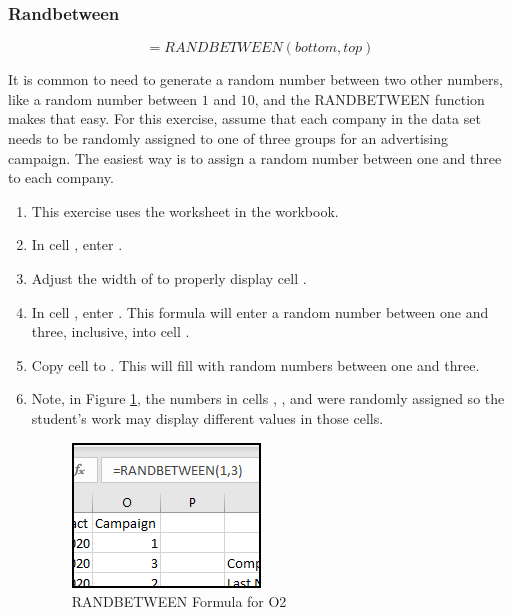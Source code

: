 \subsubsection{Randbetween}

\[ =RANDBETWEEN(bottom, top) \]

It is common to need to generate a random number between two other numbers, like a random number between $ 1 $ and $ 10 $, and the RANDBETWEEN function makes that easy. For this exercise, assume that each company in the data set needs to be randomly assigned to one of three groups for an advertising campaign. The easiest way is to assign a random number between one and three to each company.

\begin{enumbox}
	\begin{enumerate}
		\item This exercise uses the  worksheet in the  workbook.
		\item In cell , enter .
		\item Adjust the width of  to properly display cell .
		\item In cell , enter . This formula will enter a random number between one and three, inclusive, into cell .
		\item Copy cell  to . This will fill  with random numbers between one and three.
		\item Note, in Figure \ref{09:fig44}, the numbers in cells , , and  were randomly assigned so the student's work may display different values in those cells.
		
		\begin{figure}[H]
			\centering
			\includegraphics[width=\maxwidth{.50\linewidth}]{gfx/ch09_fig44}
			\caption{RANDBETWEEN Formula for O2}
			\label{09:fig44}
		\end{figure}
		
	\end{enumerate}
\end{enumbox}

